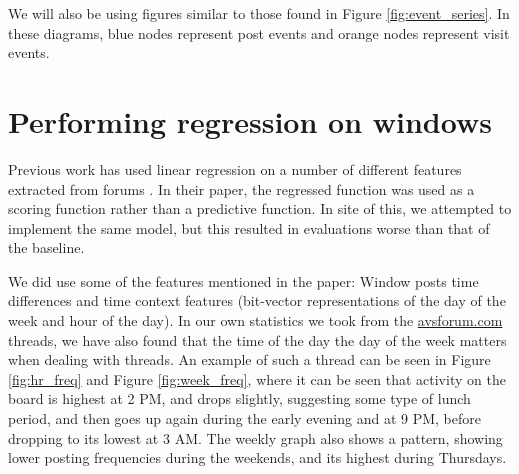 We will also be using figures similar to those found in Figure 
\ref{fig:event_series}. In these diagrams, blue nodes represent post events and 
orange nodes represent visit events.


\section{Performing regression on windows}
Previous work has used linear regression on a number of different features 
extracted from forums \cite{Yang2009}. In their paper, the regressed function 
was used as a scoring function rather than a predictive function. In site of 
this, we attempted to implement the same model, but this resulted in evaluations 
worse than that of the baseline.

We did use some of the features mentioned in the paper: Window posts time 
differences and time context features (bit-vector representations of the day of 
the week and hour of the day). In our own statistics we took from the 
\url{avsforum.com} threads, we have also found that the time of the day the day 
of the week matters when dealing with threads. An example of such a thread can 
be seen in Figure \ref{fig:hr_freq} and Figure \ref{fig:week_freq}, where it can 
be seen that activity on the board is highest at 2 PM, and drops slightly, 
suggesting some type of lunch period, and then goes up again during the early 
evening and at 9 PM, before dropping to its lowest at 3 AM. The weekly graph 
also shows a pattern, showing lower posting frequencies during the weekends, and 
its highest during Thursdays.


